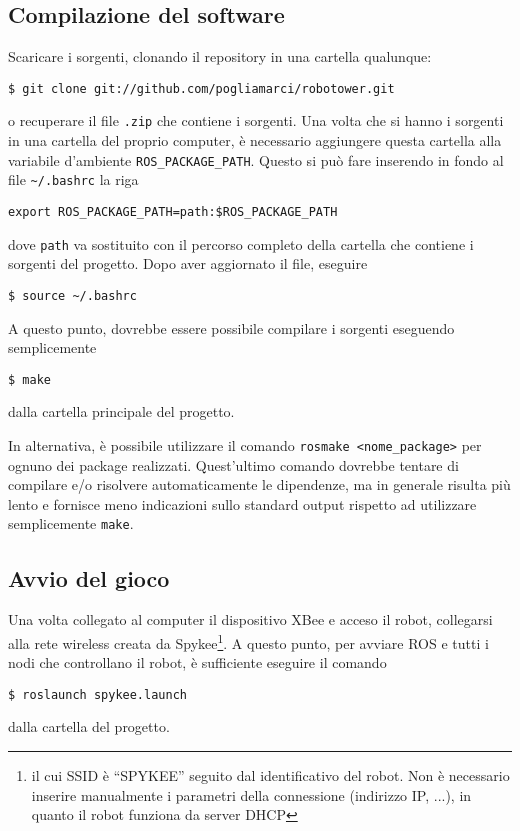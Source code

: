\subsection*{Compilazione del software} Scaricare i sorgenti, clonando il repository in una cartella qualunque:
\begin{verbatim}
$ git clone git://github.com/pogliamarci/robotower.git
\end{verbatim}
o recuperare il file \verb|.zip| che contiene i sorgenti. Una volta che si hanno i sorgenti in una cartella del proprio computer, è necessario aggiungere questa cartella alla variabile d'ambiente \verb|ROS_PACKAGE_PATH|. Questo si può fare inserendo in fondo al file \verb|~/.bashrc| la riga
\begin{verbatim}
export ROS_PACKAGE_PATH=path:$ROS_PACKAGE_PATH
\end{verbatim}
dove \verb|path| va sostituito con il percorso completo della cartella che contiene i sorgenti del progetto. Dopo aver aggiornato il file, eseguire
\begin{verbatim}
$ source ~/.bashrc
\end{verbatim}
A questo punto, dovrebbe essere possibile compilare i sorgenti eseguendo semplicemente
\begin{verbatim}
$ make
\end{verbatim}
dalla cartella principale del progetto.

\begin{nota}
In alternativa, è possibile utilizzare il comando \verb|rosmake <nome_package>| per ognuno dei package realizzati. Quest'ultimo comando dovrebbe tentare di compilare e/o risolvere automaticamente le dipendenze, ma in generale risulta più lento e fornisce meno indicazioni sullo standard output rispetto ad utilizzare semplicemente \verb|make|.
\end{nota}

\subsection*{Avvio del gioco} Una volta collegato al computer il dispositivo XBee e acceso il robot, collegarsi alla rete wireless creata da Spykee\footnote{il cui SSID è ``SPYKEE'' seguito dal identificativo del robot. Non è necessario inserire manualmente i parametri della connessione (indirizzo IP, ...), in quanto il robot funziona da server DHCP}. A questo punto, per avviare ROS e tutti i nodi che controllano il robot, è sufficiente eseguire il comando
\begin{verbatim}
$ roslaunch spykee.launch
\end{verbatim}
dalla cartella del progetto.

